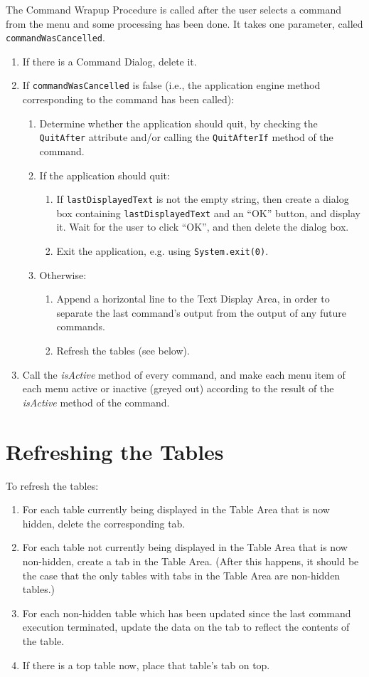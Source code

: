 \documentclass[11pt]{article}
\begin{document}
The Command Wrapup Procedure is called after the user selects a
command from the menu and some processing has been done.  It takes
one parameter, called {\tt commandWasCancelled}.
\begin{enumerate}
\item If there is a Command Dialog, delete it.
\item If {\tt commandWasCancelled} is false (i.e., the application
  engine method corresponding to the command has been called):
  \begin{enumerate}
  \item Determine whether the application should quit, by checking
    the {\tt QuitAfter} attribute and/or calling the {\tt QuitAfterIf}
    method of the command.
  \item If the application should quit:
    \begin{enumerate}
    \item If {\tt lastDisplayedText} is not the empty string, then
      create a dialog box containing {\tt lastDisplayedText} and
      an ``OK'' button, and display it.  Wait for the user to
      click ``OK'', and then delete the dialog box.
    \item Exit the application, e.g. using {\tt System.exit(0)}.
    \end{enumerate}
  \item Otherwise:
    \begin{enumerate}
    \item Append a horizontal line to the Text Display Area, in order to
      separate the last command's output from the output of any
      future commands.
    \item Refresh the tables (see below).
    \end{enumerate}
  \end{enumerate}
\item Call the {\it isActive} method of every command, and make each
  menu item of each menu active or inactive (greyed out) according to
  the result of the {\it isActive} method of the command.
\end{enumerate}

\section{Refreshing the Tables}

To refresh the tables:
\begin{enumerate}
\item For each table currently being displayed in the Table Area
  that is now hidden, delete the corresponding tab.
\item For each table not currently being displayed in the Table
  Area that is now non-hidden, create a tab in the Table Area.
  (After this happens, it should be the case that the only tables
  with tabs in the Table Area are non-hidden tables.)
\item For each non-hidden table which has been updated since the
  last command execution terminated, update the data on the tab
  to reflect the contents of the table.
\item If there is a top table now, place that table's tab on top.
\end{enumerate}
\end{document}
